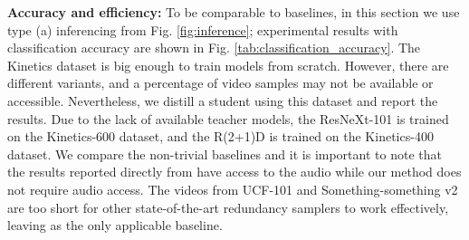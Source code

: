 \documentclass[a4paper,conference]{IEEEtran}
\begin{document}
{\bf Accuracy and efficiency:} To be comparable to baselines, in this section we use type (a) inferencing from Fig. \ref{fig:inference}; experimental results with classification accuracy are shown in Fig. \ref{tab:classification_accuracy}. The Kinetics dataset is big enough to train models from scratch. However, there are different variants, and a percentage of video samples may not be available or accessible. Nevertheless, we distill a student using this dataset and report the results. Due to the lack of available teacher models, the ResNeXt-101 is trained on the Kinetics-600 dataset, and the R(2+1)D is trained on the Kinetics-400 dataset. We compare the non-trivial baselines \cite{korbar2019scsampler, devries2018learning} and it is important to note that the results reported directly from \cite{korbar2019scsampler} have access to the audio while our method does not require audio access. The videos from UCF-101 and Something-something v2 are too short for other state-of-the-art redundancy samplers \cite{korbar2019scsampler, gao2020listen} to work effectively, leaving \cite{devries2018learning} as the only applicable baseline. 
\end{document}
